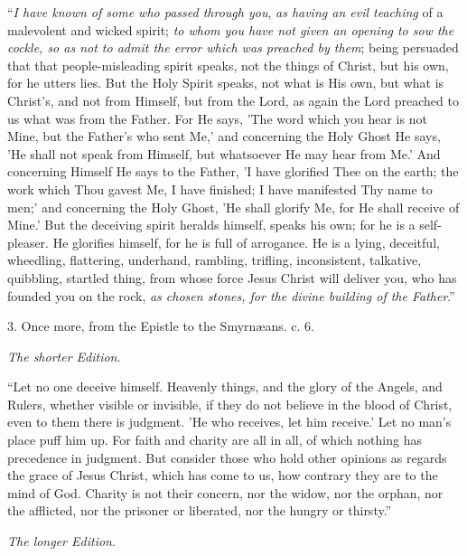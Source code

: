 ``\emph{I
have known of some who passed through you}, \emph{as having an evil
teaching} of a malevolent and wicked spirit; \emph{to whom you have
not given an opening to sow the cockle, so as not to admit the error
which was preached by them}; being persuaded that that
people-misleading spirit speaks, not the things of Christ, but his
own, for he utters lies. But the Holy Spirit speaks, not what is His
own, but what is Christ's, and not from Himself, but from the Lord, as
again the Lord preached to us what was from the Father. For He says,
'The word which you hear is not Mine, but the Father's who sent Me,'
and concerning the Holy Ghost He says, 'He shall not speak from
Himself, but whatsoever He may hear from Me.' And concerning Himself
He says to the Father, 'I have glorified Thee on the earth; the
work which Thou gavest Me, I have finished; I have manifested Thy name
to men;' and concerning the Holy Ghost, 'He shall glorify Me, for He
shall receive of Mine.' But the deceiving spirit heralds himself,
speaks his own; for he is a self-pleaser. He glorifies himself, for he
is full of arrogance. He is a lying, deceitful, wheedling, flattering,
underhand, rambling, trifling, inconsistent, talkative, quibbling,
startled thing, from whose force Jesus Christ will deliver you, who
has founded you on the rock, \emph{as chosen stones, for the divine
building of the Father}.''

3. Once more, from the Epistle
to the Smyrnæans. c. 6.

\emph{The
shorter Edition}.

``Let
no one deceive himself. Heavenly things, and the glory of the Angels,
and Rulers, whether visible or invisible, if they do not believe in
the blood of Christ, even to them there is judgment. 'He who receives,
let him receive.' Let no man's place puff him up. For faith and
charity are all in all, of which nothing has precedence in judgment.
But consider those who hold other opinions as regards the grace of
Jesus Christ, which has come to us, how contrary they are to the mind
of God. Charity is not their concern, nor the widow, nor the orphan,
nor the afflicted, nor the prisoner or liberated, nor the hungry or
thirsty.''

\emph{The
longer Edition}.

